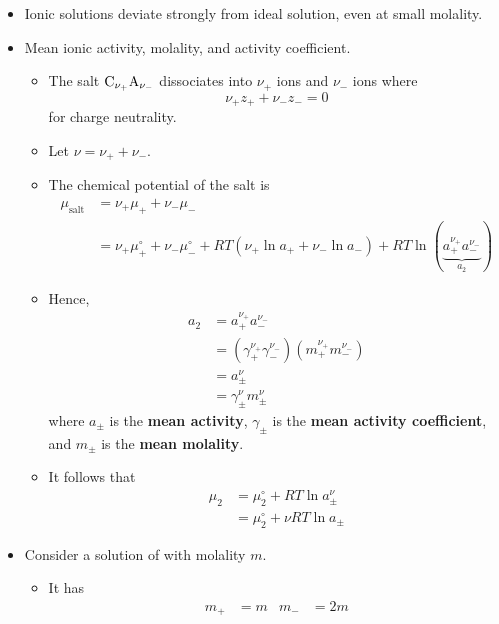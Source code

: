 \documentclass[../notes.tex]{subfiles}
\begin{document}
\begin{itemize}
    \item Ionic solutions deviate strongly from ideal solution, even at small molality.
    \item Mean ionic activity, molality, and activity coefficient.
    \begin{itemize}
        \item The salt $\ce{C}_{\nu_+}\ce{A}_{\nu_-}$ dissociates into $\nu_+$  ions and $\nu_-$  ions where
        \begin{equation*}
            \nu_+z_++\nu_-z_- = 0
        \end{equation*}
        for charge neutrality.
        \item Let $\nu=\nu_++\nu_-$.
        \item The chemical potential of the salt is
        \begin{align*}
            \mu_\text{salt} &= \nu_+\mu_++\nu_-\mu_-\\
            &= \nu_+\mu_+^\circ+\nu_-\mu_-^\circ+RT(\nu_+\ln a_++\nu_-\ln a_-)+RT\ln(\underbrace{a_+^{\nu_+}a_-^{\nu_-}}_{a_2})
        \end{align*}
        \item Hence,
        \begin{align*}
            a_2 &= a_+^{\nu_+}a_-^{\nu_-}\\
            &= (\gamma_+^{\nu_+}\gamma_-^{\nu_-})(m_+^{\nu_+}m_-^{\nu_-})\\
            &= a_\pm^\nu\\
            &= \gamma_\pm^\nu m_\pm^\nu
        \end{align*}
        where $a_\pm$ is the \textbf{mean activity}, $\gamma_\pm$ is the \textbf{mean activity coefficient}, and $m_\pm$ is the \textbf{mean molality}.
        \item It follows that
        \begin{align*}
            \mu_2 &= \mu_2^\circ+RT\ln a_\pm^\nu\\
            &= \mu_2^\circ+\nu RT\ln a_\pm
        \end{align*}
    \end{itemize}
    \item Consider a solution of  with molality $m$.
    \begin{itemize}
        \item It has
        \begin{align*}
            m_+ &= m&
            m_- &= 2m
        \end{align*}

\end{itemize}
\end{itemize}
\end{document}
